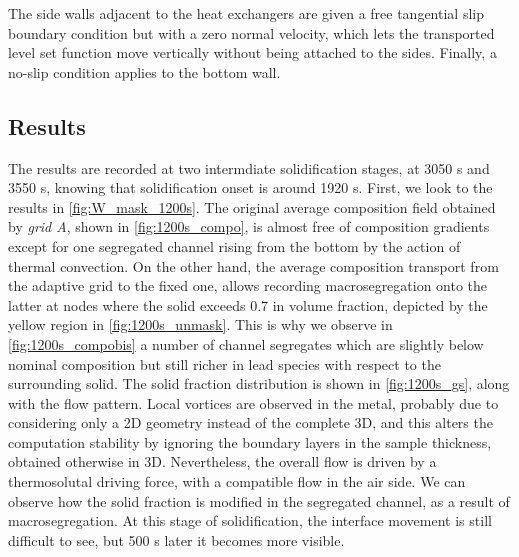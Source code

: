 The side walls adjacent to the heat exchangers are given a free tangential slip boundary condition but with a zero normal velocity, which lets the transported 
level set function move vertically without being attached to the sides. Finally, a no-slip condition applies to the bottom wall. 


\subsection{Results}

The results are recorded at two intermdiate solidification stages, at 3050 s and 3550 s, knowing that solidification onset is around 1920 s.
First, we look to the results in \cref{fig:W_mask_1200s}. The original average composition field obtained by \emph{grid A}, shown in \cref{fig:1200s_compo},
is almost free of composition gradients except for one segregated channel rising from the bottom by the action of thermal convection.
On the other hand, the average composition transport from the adaptive grid to the fixed one, allows recording macrosegregation onto the latter
at nodes where the solid exceeds 0.7 in volume fraction, depicted by the yellow region in \cref{fig:1200s_unmask}. 
This is why we observe in \cref{fig:1200s_compobis} a number of channel segregates
which are slightly below nominal composition but still richer in lead species with respect to the surrounding solid.
The solid fraction distribution is shown in \cref{fig:1200s_gs}, along with the flow pattern. Local vortices are observed in the metal, probably due 
to considering only a 2D geometry instead of the complete 3D, and this alters the computation stability by ignoring the boundary layers in the sample 
thickness, obtained otherwise in 3D. Nevertheless, the overall 
flow is driven by a thermosolutal driving force, with a compatible flow in the air side. 
We can observe how the solid fraction is modified in the segregated channel, as a result of macrosegregation.
At this stage of solidification, the interface movement is still difficult to see, but 500 s later it becomes more visible.

